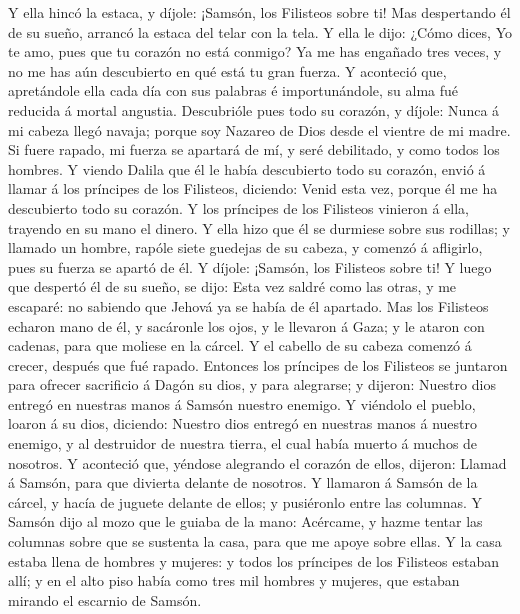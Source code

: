  Y ella hincó la estaca, y díjole: ¡Samsón, los Filisteos
sobre ti! Mas despertando él de su sueño, arrancó la estaca del telar
con la tela.  Y ella le dijo: ¿Cómo dices, Yo te amo,
pues que tu corazón no está conmigo? Ya me has engañado tres veces, y no
me has aún descubierto en qué está tu gran fuerza.  Y
aconteció que, apretándole ella cada día con sus palabras é
importunándole, su alma fué reducida á mortal angustia. 
Descubrióle pues todo su corazón, y díjole: Nunca á mi cabeza llegó
navaja; porque soy Nazareo de Dios desde el vientre de mi madre. Si
fuere rapado, mi fuerza se apartará de mí, y seré debilitado, y como
todos los hombres.  Y viendo Dalila que él le había
descubierto todo su corazón, envió á llamar á los príncipes de los
Filisteos, diciendo: Venid esta vez, porque él me ha descubierto todo su
corazón. Y los príncipes de los Filisteos vinieron á ella, trayendo en
su mano el dinero.  Y ella hizo que él se durmiese sobre
sus rodillas; y llamado un hombre, rapóle siete guedejas de su cabeza, y
comenzó á afligirlo, pues su fuerza se apartó de él.  Y
díjole: ¡Samsón, los Filisteos sobre ti! Y luego que despertó él de su
sueño, se dijo: Esta vez saldré como las otras, y me escaparé: no
sabiendo que Jehová ya se había de él apartado.  Mas los
Filisteos echaron mano de él, y sacáronle los ojos, y le llevaron á
Gaza; y le ataron con cadenas, para que moliese en la cárcel.
 Y el cabello de su cabeza comenzó á crecer, después que
fué rapado.  Entonces los príncipes de los Filisteos se
juntaron para ofrecer sacrificio á Dagón su dios, y para alegrarse; y
dijeron: Nuestro dios entregó en nuestras manos á Samsón nuestro
enemigo.  Y viéndolo el pueblo, loaron á su dios,
diciendo: Nuestro dios entregó en nuestras manos á nuestro enemigo, y al
destruidor de nuestra tierra, el cual había muerto á muchos de nosotros.
 Y aconteció que, yéndose alegrando el corazón de ellos,
dijeron: Llamad á Samsón, para que divierta delante de nosotros. Y
llamaron á Samsón de la cárcel, y hacía de juguete delante de ellos; y
pusiéronlo entre las columnas.  Y Samsón dijo al mozo que
le guiaba de la mano: Acércame, y hazme tentar las columnas sobre que se
sustenta la casa, para que me apoye sobre ellas.  Y la
casa estaba llena de hombres y mujeres: y todos los príncipes de los
Filisteos estaban allí; y en el alto piso había como tres mil hombres y
mujeres, que estaban mirando el escarnio de Samsón. 
